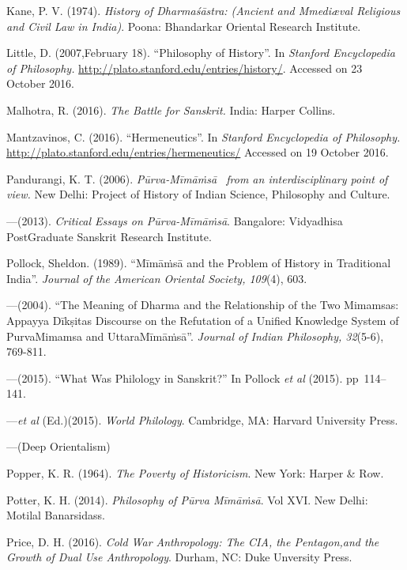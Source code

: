 \begin{thebibliography}{99}
  Kane, P. V. (1974). \textit{History of Dharmaśāstra: (Ancient and Mmediæval Religious and Civil Law in India)}. Poona: Bhandarkar Oriental Research Institute.

  Little, D. (2007,February 18). “Philosophy of History”. In \textit{Stanford Encyclopedia of Philosophy.} \url{http://plato.stanford.edu/entries/history/}. Accessed on 23 October 2016.

  Malhotra, R. (2016). \textit{The Battle for Sanskrit.} India: Harper Collins.

  Mantzavinos, C. (2016). “Hermeneutics”. In \textit{Stanford Encyclopedia of Philosophy.} \url{http://plato.stanford.edu/entries/hermeneutics/} Accessed on 19 October 2016.

  Pandurangi, K. T. (2006). \textit{Pūrva-Mīmāṁsā  from an interdisciplinary point of view.} New Delhi: Project of History of Indian Science, Philosophy and Culture.

  —(2013). \textit{Critical Essays on Pūrva-Mīmāṁsā}. Bangalore: Vidyadhisa PostGraduate Sanskrit Research Institute.

  Pollock, Sheldon. (1989). “Mīmāṁsā and the Problem of History in Traditional India”. \textit{Journal of the American Oriental Society, 109}(4), 603.

  —(2004). “The Meaning of Dharma and the Relationship of the Two Mimamsas: Appayya Dīkṣitas Discourse on the Refutation of a Unified Knowledge System of PurvaMimamsa and UttaraMīmāṁsā”. \textit{Journal of Indian Philosophy, 32}(5-6), 769-811.

  —(2015). “What Was Philology in Sanskrit?” In Pollock \textit{et al} (2015). pp~114--141.

  —\textit{et al} (Ed.)(2015). \textit{World Philology}. Cambridge, MA: Harvard University Press.

  —(Deep Orientalism)

  Popper, K. R. (1964). \textit{The Poverty of Historicism}. New York: Harper \& Row.

  Potter, K. H. (2014). \textit{Philosophy of Pūrva Mīmāṁsā}. Vol XVI. New Delhi: Motilal Banarsidass.

  Price, D. H. (2016). \textit{Cold War Anthropology: The CIA, the Pentagon,and the Growth of Dual Use Anthropology}. Durham, NC: Duke Unversity Press.


\end{thebibliography}
